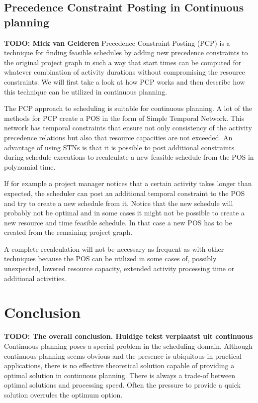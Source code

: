 \documentclass{article}
\newcommand{\TODO}[1]{{\color{red}\textbf{TODO: #1}}}
\begin{document}
\subsection{Precedence Constraint Posting in Continuous planning}
\TODO{Mick van Gelderen}
Precedence Constraint Posting (PCP) is a technique for finding feasible schedules by adding new precedence constraints to the original project graph in such a way that start times can be computed for whatever combination of activity durations without compromising the resource constraints.
We will first take a look at how PCP works and then describe how this technique can be utilized in continuous planning.


The PCP approach to scheduling is suitable for continuous planning.
A lot of the methods for PCP create a POS in the form of Simple Temporal Network.
This network has temporal constraints that ensure not only consistency of the activity precedence relations but also that resource capacities are not exceeded.
An advantage of using STNs is that it is possible to post additional constraints during schedule executions to recalculate a new feasible schedule from the POS in polynomial time.

If for example a project manager notices that a certain activity takes longer than expected, the scheduler can post an additional temporal constraint to the POS and try to create a new schedule from it.
Notice that the new schedule will probably not be optimal and in some cases it might not be possible to create a new resource and time feasible schedule.
In that case a new POS has to be created from the remaining project graph.


A complete recalculation will not be necessary as frequent as with other techniques because the POS can be utilized in some cases of, possibly unexpected, lowered resource capacity, extended activity processing time or additional activities.


\newpage

\section{Conclusion}
\TODO{The overall conclusion.
Huidige tekst verplaatst uit continuous}
Continuous planning poses a special problem in the scheduling domain.
Although continuous planning seems obvious and the presence is ubiquitous in practical applications, there is no effective theoretical solution capable of providing a optimal solution in continuous planning.
There is always a trade-of between optimal solutions and processing speed.
Often the pressure to provide a quick solution overrules the optimum option.

\newpage


\end{document}
